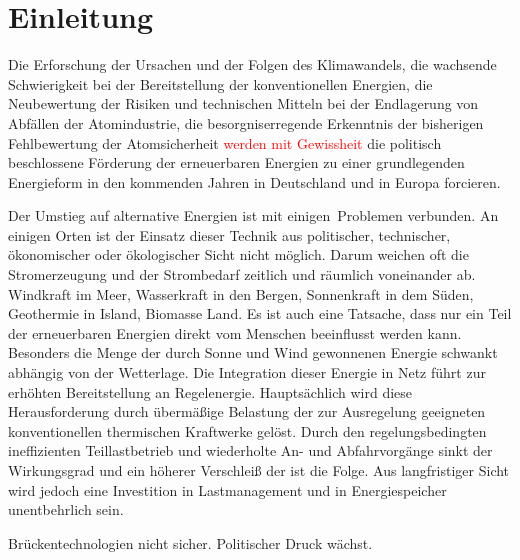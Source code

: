 \chapter{Einleitung}
\label{chap:einleitung}

%

Die Erforschung der Ursachen und der
Folgen des Klimawandels, die wachsende Schwierigkeit bei der Bereitstellung der
konventionellen Energien, die Neubewertung der Risiken und technischen Mitteln
bei der Endlagerung von Abfällen der Atomindustrie, die besorgniserregende
Erkenntnis der bisherigen Fehlbewertung der Atomsicherheit
\textcolor{red}{werden mit Gewissheit} die politisch beschlossene Förderung der
erneuerbaren Energien zu einer grundlegenden Energieform in den kommenden Jahren
in Deutschland und in Europa forcieren.

Der Umstieg auf alternative Energien ist mit einigen$\,$ Problemen verbunden. An einigen Orten ist der Einsatz dieser
Technik aus politischer, technischer, ökonomischer oder ökologischer Sicht nicht
möglich. Darum weichen oft die Stromerzeugung und der Strombedarf zeitlich und
räumlich voneinander ab. Windkraft im Meer, Wasserkraft in den Bergen,
Sonnenkraft in dem Süden, Geothermie in Island, Biomasse Land. Es ist auch eine Tatsache, dass nur ein Teil der
erneuerbaren Energien direkt vom Menschen beeinflusst werden kann. Besonders die
Menge der durch Sonne und Wind gewonnenen Energie schwankt abhängig von der
Wetterlage. Die Integration dieser Energie in Netz führt zur erhöhten
Bereitstellung an Regelenergie. Hauptsächlich wird diese Herausforderung durch
übermäßige Belastung der zur Ausregelung geeigneten konventionellen thermischen
Kraftwerke gelöst. Durch den regelungsbedingten ineffizienten Teillastbetrieb
und wiederholte An- und Abfahrvorgänge sinkt der Wirkungsgrad und ein höherer
Verschleiß der ist die Folge. Aus langfristiger Sicht wird
jedoch eine
Investition in Lastmanagement und in Energiespeicher unentbehrlich sein.

Brückentechnologien nicht sicher. Politischer Druck wächst. 

